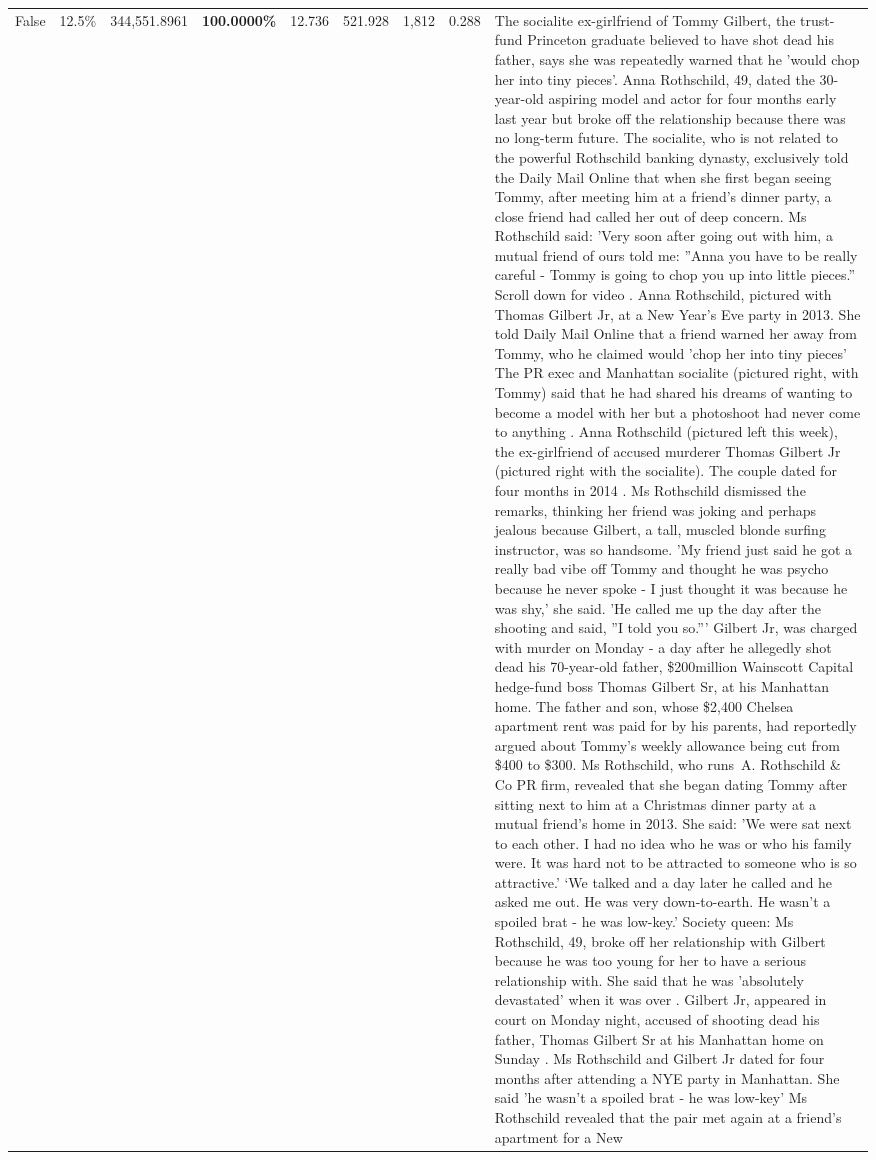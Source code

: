 \begin{table}[H]
\begin{tabular}{lllrlllll}
False & 12.5\% & 344,551.8961 & \bfseries \color{red} 100.0000\% & 12.736 & 521.928 & 1,812 & 0.288 & The socialite ex-girlfriend of Tommy Gilbert, the trust-fund Princeton graduate believed to have shot dead his father, says she was repeatedly warned that he 'would chop her into tiny pieces'. Anna Rothschild, 49, dated the 30-year-old aspiring model and actor for four months early last year but broke off the relationship because there was no long-term future. The socialite, who is not related to the powerful Rothschild banking dynasty, exclusively told the Daily Mail Online that when she first began seeing Tommy, after meeting him at a friend's dinner party, a close friend had called her out of deep concern. Ms Rothschild said: 'Very soon after going out with him, a mutual friend of ours told me: ''Anna you have to be really careful - Tommy is going to chop you up into little pieces.'' Scroll down for video . Anna Rothschild, pictured with Thomas Gilbert Jr, at a New Year's Eve party in 2013. She told Daily Mail Online that a friend warned her away from Tommy, who he claimed would 'chop her into tiny pieces' The PR exec and Manhattan socialite (pictured right, with Tommy) said that he had shared his dreams of wanting to become a model with her but a photoshoot had never come to anything . Anna Rothschild (pictured left this week), the ex-girlfriend of accused murderer Thomas Gilbert Jr (pictured right with the socialite). The couple dated for four months in 2014 . Ms Rothschild dismissed the remarks, thinking her friend was joking and perhaps jealous because Gilbert, a tall, muscled blonde surfing instructor, was so handsome. 'My friend just said he got a really bad vibe off Tommy and thought he was psycho because he never spoke - I just thought it was because he was shy,' she said. 'He called me up the day after the shooting and said, ''I told you so.''' Gilbert Jr, was charged with murder on Monday - a day after he allegedly shot dead his 70-year-old father, \$200million Wainscott Capital hedge-fund boss Thomas Gilbert Sr, at his Manhattan home. The father and son, whose \$2,400 Chelsea apartment rent was paid for by his parents, had reportedly argued about Tommy's weekly allowance being cut from \$400 to \$300. Ms Rothschild, who runs A. Rothschild \& Co PR firm, revealed that she began dating Tommy after sitting next to him at a Christmas dinner party at a mutual friend's home in 2013. She said: 'We were sat next to each other. I had no idea who he was or who his family were. It was hard not to be attracted to someone who is so attractive.' ‘We talked and a day later he called and he asked me out. He was very down-to-earth. He wasn’t a spoiled brat - he was low-key.’ Society queen: Ms Rothschild, 49, broke off her relationship with Gilbert because he was too young for her to have a serious relationship with. She said that he was 'absolutely devastated' when it was over . Gilbert Jr, appeared in court on Monday night, accused of shooting dead his father, Thomas Gilbert Sr at his Manhattan home on Sunday . Ms Rothschild and Gilbert Jr dated for four months after attending a NYE party in Manhattan. She said 'he wasn't a spoiled brat - he was low-key' Ms Rothschild revealed that the pair met again at a friend’s apartment for a New 
\end{tabular}
\end{table}
